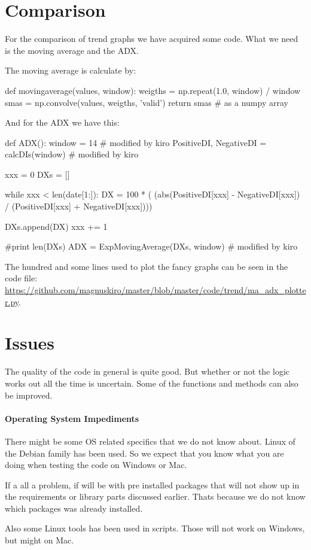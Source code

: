 \section{Comparison}\label{code:comparison}

For the comparison of trend graphs we have acquired some code.
What we need is the moving average and the ADX.

The moving average is calculate by: 
\begin{python}
def movingaverage(values, window):
    weigths = np.repeat(1.0, window) / window
    smas = np.convolve(values, weigths, 'valid')
    return smas  # as a numpy array
\end{python}

And for the ADX we have this: 
\begin{python}
def ADX():
    window = 14  # modified by kiro
    PositiveDI, NegativeDI = calcDIs(window)  # modified by kiro

    xxx = 0
    DXs = []

    while xxx < len(date[1:]):
        DX = 100 * ( (abs(PositiveDI[xxx] - NegativeDI[xxx])
                      / (PositiveDI[xxx] + NegativeDI[xxx])))

        DXs.append(DX)
        xxx += 1

    #print len(DXs)
    ADX = ExpMovingAverage(DXs, window)  # modified by kiro
\end{python}

The hundred and some lines used to plot the fancy graphs can be seen in the
code file:
\url{https://github.com/magnuskiro/master/blob/master/code/trend/ma_adx_plotter.py}.

%
 
\section{Issues}\label{code:issues}
The  quality of the code in general is quite good. But whether or not the logic
works out all the time is uncertain. Some of the functions and methods can also
be improved.   

\paragraph{Operating System Impediments}
There might be some OS related specifics that we do not know about. Linux of
the Debian family has been used. So we expect that you know what you are doing
when testing the code on Windows or Mac.

If a all a problem, if will be with pre installed packages that will not
show up in the requirements or library parts discussed earlier. Thats because we
do not know which packages was already installed.  

Also some Linux tools has been used in scripts. Those will not work on Windows,
but might on Mac.
